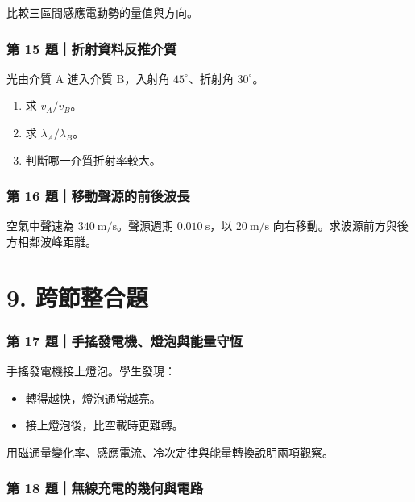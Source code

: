 \documentclass[11pt,a4paper]{article}
\providecommand{\tightlist}{%
  \setlength{\itemsep}{0pt}\setlength{\parskip}{0pt}}
\begin{document}
比較三區間感應電動勢的量值與方向。

\subsubsection{第 15 題｜折射資料反推介質}\label{ux7b2c-15-ux984cux6298ux5c04ux8cc7ux6599ux53cdux63a8ux4ecbux8cea}

光由介質 A 進入介質 B，入射角 \(45^\circ\)、折射角 \(30^\circ\)。

\begin{enumerate}
\def\labelenumi{\arabic{enumi}.}
\tightlist
\item
  求 \(v_A/v_B\)。
\item
  求 \(\lambda_A/\lambda_B\)。
\item
  判斷哪一介質折射率較大。
\end{enumerate}

\subsubsection{第 16 題｜移動聲源的前後波長}\label{ux7b2c-16-ux984cux79fbux52d5ux8072ux6e90ux7684ux524dux5f8cux6ce2ux9577}

空氣中聲速為 \(340\ \mathrm{m/s}\)。聲源週期 \(0.010\ \mathrm s\)，以 \(20\ \mathrm{m/s}\) 向右移動。求波源前方與後方相鄰波峰距離。

\section{9. 跨節整合題}\label{ux8de8ux7bc0ux6574ux5408ux984c}

\subsubsection{第 17 題｜手搖發電機、燈泡與能量守恆}\label{ux7b2c-17-ux984cux624bux6416ux767cux96fbux6a5fux71c8ux6ce1ux8207ux80fdux91cfux5b88ux6046}

手搖發電機接上燈泡。學生發現：

\begin{itemize}
\tightlist
\item
  轉得越快，燈泡通常越亮。
\item
  接上燈泡後，比空載時更難轉。
\end{itemize}

用磁通量變化率、感應電流、冷次定律與能量轉換說明兩項觀察。

\subsubsection{第 18 題｜無線充電的幾何與電路}\label{ux7b2c-18-ux984cux7121ux7ddaux5145ux96fbux7684ux5e7eux4f55ux8207ux96fbux8def}
\end{document}
